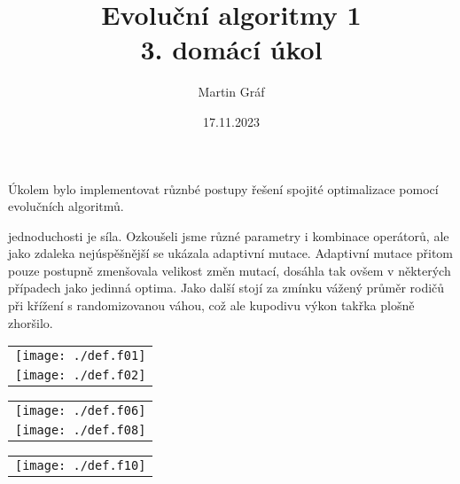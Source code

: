 \documentclass[a4paper]{article}
\newenvironment{ukol}[3][]{\begin{trivlist} 
\item[\hskip \labelsep {\bfseries #1}\hskip \labelsep {\bfseries #2}]}{\end{trivlist}}
\begin{document}
 
 
\title{ Evoluční algoritmy 1 \\ 3. domácí úkol
        } 
\author{Martin Gráf}
\date{17.11.2023}

\maketitle

Úkolem bylo implementovat různbé postupy řešení spojité optimalizace pomocí evolučních algoritmů.

\begin{ukol}{Klasické a adaptivní}

V jednoduchosti je síla. Ozkoušeli jsme různé parametry i kombinace operátorů, ale jako zdaleka nejúspěšnější se ukázala adaptivní mutace. Adaptivní 
mutace přitom pouze postupně zmenšovala velikost změn mutací, dosáhla tak ovšem v některých případech jako jedinná optima. Jako další stojí za zmínku vážený
průměr rodičů při křížení s randomizovanou váhou, což ale kupodivu výkon takřka plošně zhoršilo.

\begin{center}
	\begin{tabular}{ c }
		\texttt{[image: ./def.f01]} \\ 
		\texttt{[image: ./def.f02]} \\ 
	\end{tabular}
\end{center}

\begin{center}
	\begin{tabular}{ c }
		\texttt{[image: ./def.f06]} \\
		\texttt{[image: ./def.f08]} \\ 
	\end{tabular}
\end{center}

\begin{center}
	\begin{tabular}{ c }
		\texttt{[image: ./def.f10]} \\ 
	\end{tabular}
\end{center}

\end{ukol}
\end{document}
